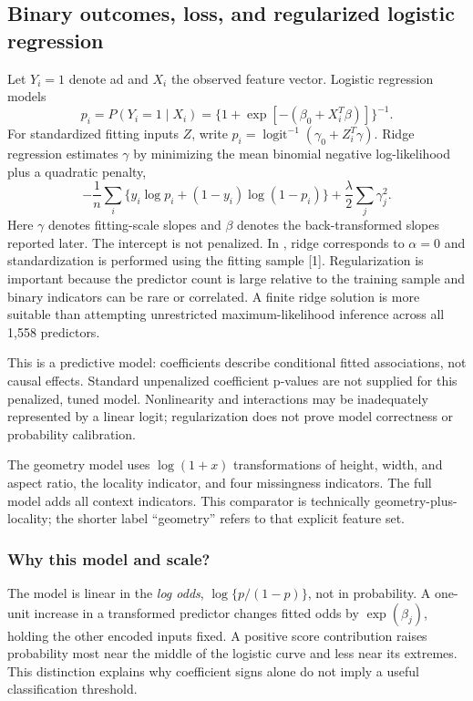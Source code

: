 \documentclass[11pt,a4paper]{article}
\newcommand{\code}[1]{\texttt{\detokenize{#1}}}
\begin{document}
\subsection{Binary outcomes, loss, and regularized logistic regression}
Let $Y_i=1$ denote ad and $X_i$ the observed feature vector. Logistic regression models
\[p_i=P(Y_i=1\mid X_i)=\{1+\exp[-(\beta_0+X_i^T\beta)]\}^{-1}.\]
For standardized fitting inputs $Z$, write $p_i=\operatorname{logit}^{-1}(\gamma_0+Z_i^T\gamma)$. Ridge regression estimates $\gamma$ by minimizing the mean binomial negative log-likelihood plus a quadratic penalty,
\[ -\frac1n\sum_i\{y_i\log p_i+(1-y_i)\log(1-p_i)\}+\frac\lambda2\sum_j\gamma_j^2. \]
Here $\gamma$ denotes fitting-scale slopes and $\beta$ denotes the back-transformed slopes reported later. The intercept is not penalized. In \code{glmnet}, ridge corresponds to $\alpha=0$ and standardization is performed using the fitting sample [1]. Regularization is important because the predictor count is large relative to the training sample and binary indicators can be rare or correlated. A finite ridge solution is more suitable than attempting unrestricted maximum-likelihood inference across all 1,558 predictors.

This is a predictive model: coefficients describe conditional fitted associations, not causal effects. Standard unpenalized coefficient p-values are not supplied for this penalized, tuned model. Nonlinearity and interactions may be inadequately represented by a linear logit; regularization does not prove model correctness or probability calibration.

The geometry model uses $\log(1+x)$ transformations of height, width, and aspect ratio, the locality indicator, and four missingness indicators. The full model adds all context indicators. This comparator is technically geometry-plus-locality; the shorter label ``geometry'' refers to that explicit feature set.

\subsubsection{Why this model and scale?}
The model is linear in the \emph{log odds}, $\log\{p/(1-p)\}$, not in probability. A one-unit increase in a transformed predictor changes fitted odds by $\exp(\beta_j)$, holding the other encoded inputs fixed. A positive score contribution raises probability most near the middle of the logistic curve and less near its extremes. This distinction explains why coefficient signs alone do not imply a useful classification threshold.
\end{document}
